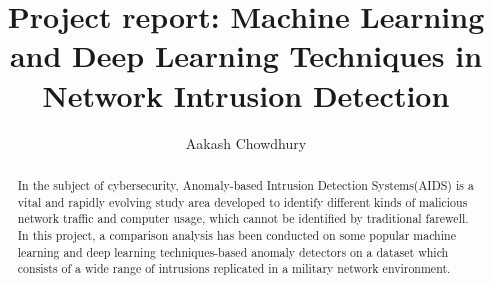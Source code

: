 \documentclass{llncs}
\title{\textsf{Project report: } Machine Learning and Deep Learning Techniques in Network Intrusion Detection}
\author{Aakash Chowdhury}
\institute{Alpen-Adria-Universität, Klagenfurt }
\begin{document}
\vspace{-3cm}
\maketitle

\begin{abstract}
In the subject of cybersecurity, Anomaly-based Intrusion Detection Systems(AIDS) is a vital and rapidly evolving study area developed to identify different kinds of malicious network traffic and computer usage, which cannot be identified by traditional farewell.
In this project, a comparison analysis has been conducted on some popular machine learning and deep learning techniques-based anomaly detectors on a dataset which consists of a wide range of intrusions replicated in a military network environment.    
\end{abstract}
\end{document}
